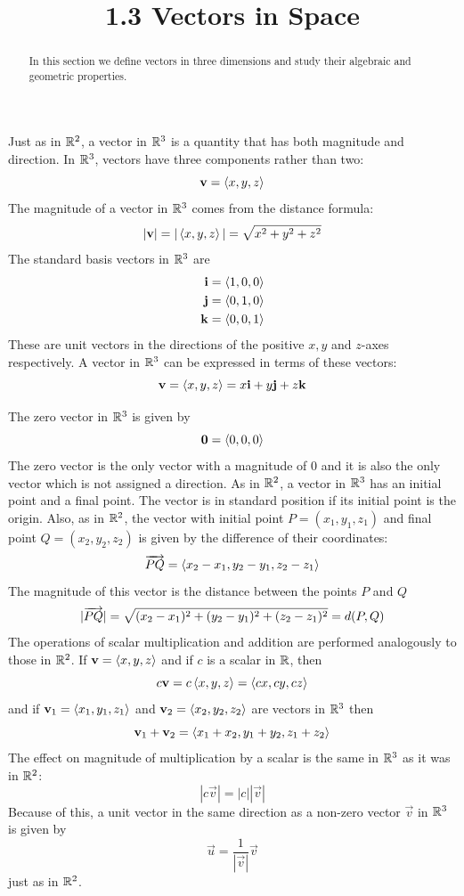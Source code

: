 \documentclass[handout]{ximera}
\title{1.3 Vectors in Space}
\begin{document}
\begin{abstract}
In this section we define vectors in three dimensions and study their algebraic and geometric properties.
\end{abstract}
 
\maketitle

Just as in $\mathbb R^2$, a vector in $\mathbb R^3$ is a quantity that has both magnitude and direction.
In $\mathbb R^3$, vectors have three components rather than two:
\[
\mathbf{v} = \left\langle x, y, z\right\rangle
\]
The magnitude of a vector in $\mathbb R^3$ comes from the distance formula:
\[
|\mathbf{v}| = |\left\langle x, y, z\right\rangle| = \sqrt{x^2 + y^2 + z^2}
\]
The standard basis vectors in $\mathbb R^3$ are
\begin{align*}
\mathbf{i} &= \left\langle 1, 0, 0\right\rangle\\
\mathbf{j} &= \left\langle 0, 1, 0\right\rangle\\
\mathbf{k} &= \left\langle 0, 0, 1\right\rangle\\
\end{align*}
These are unit vectors in the directions of the positive $x, y$ and $z$-axes respectively.
A vector in $\mathbb R^3$ can be expressed in terms of these vectors:
\[
\mathbf{v} = \left\langle x, y, z\right\rangle = x\mathbf{i} + y\mathbf{j} + z\mathbf{k}
\]

The zero vector in $\mathbb R^3$ is given by
\[
\mathbf{0} = \left\langle 0,0,0\right\rangle
\]
The zero vector is the only vector with a magnitude of $0$ and it is also the only vector which is not assigned a direction.
As in $\mathbb R^2$, a vector in $\mathbb R^3$ has an initial point and a final point.  The vector is in standard position if its initial point is the origin.
Also, as in $\mathbb R^2$, the vector with initial point $P = (x_1, y_1, z_1)$ and final point $Q = (x_2, y_2, z_2)$ is given by the difference of their coordinates:
\[
\arrowvec{PQ} = \vector{x_2 - x_1, y_2-y_1, z_2-z_1} %
\]
The magnitude of this vector is the distance between the points $P$ and $Q$
\[
|\arrowvec{PQ}| = \sqrt{(x_2-x_1)^2 + (y_2-y_1)^2 +(z_2-z_1)^2} = d(P, Q) %
\]
The operations of scalar multiplication and addition are performed analogously to those in $\mathbb R^2$.
If $\mathbf{v} = \left\langle x, y, z\right\rangle$ and if $c$ is a scalar in $\mathbb R$, then
\[
c\mathbf{v} = c\left\langle x, y, z\right\rangle = \left\langle cx, cy, cz\right\rangle
\]
and if $\mathbf{v}_1 = \left\langle x_1, y_1, z_1\right\rangle$ and $\mathbf{v}_2 = \left\langle x_2, y_2, z_2\right\rangle$ are vectors in $\mathbb R^3$ then
\[
\mathbf{v}_1 + \mathbf{v}_2 = \left\langle x_1+x_2, y_1+y_2, z_1+z_2\right\rangle
\]
The effect on magnitude of multiplication by a scalar is the same in $\mathbb R^3$ as it was in $\mathbb R^2$:
\[
|c\vec{v}| = |c| |\vec{v}|
\]
Because of this, a unit vector in the same direction as a non-zero vector $\vec{v}$ in $\mathbb R^3$ is given by
\[
\vec{u} = \frac{1}{|\vec{v}|} \vec{v}
\]
just as in $\mathbb R^2$.
\end{document}

